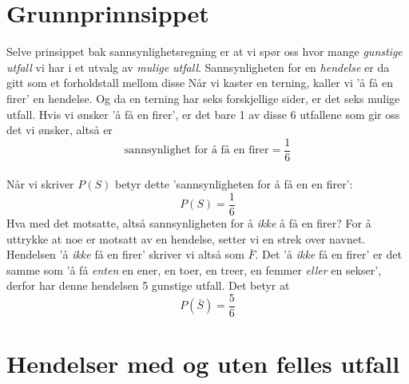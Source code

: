 

%

\section{Grunnprinnsippet}
Selve prinsippet bak sannsynlighetsregning er at vi spør oss hvor mange \textit{gunstige utfall}  vi har i et utvalg av \textit{mulige utfall}. Sannsynligheten for en \textit{hendelse} er da gitt som et forholdstall mellom disse \regv
{} \vsk
Når vi kaster en terning, kaller vi 'å få en firer' en hendelse. Og da en terning har seks forskjellige sider, er det seks mulige utfall.
Hvis vi ønsker 'å få en firer', er det bare 1 av disse 6 utfallene som gir oss det vi ønsker, altså er
\[ \text{sannsynlighet for å få en firer}=
 \frac{1}{6} \]
\qquad {} \\[5pt]
Når vi skriver $P(S)$ betyr dette 'sannsynligheten for å få en en firer':
\[ P(S)=\frac{1}{6} \]
Hva med det motsatte, altså sannsynligheten for å \textsl{ikke} å få en firer? For å uttrykke at noe er motsatt av en hendelse, setter vi en strek over navnet. Hendelsen 'å \textsl{ikke} få en firer' skriver vi altså som $ \bar{F} $. Det 'å \textsl{ikke} få en firer' er det samme som 'å få \textsl{enten} en ener, en toer, en treer, en femmer \textsl{eller} en sekser', derfor har denne hendelsen 5 gunstige utfall. Det betyr at
\[ P(\bar{S})=\frac{5}{6} \]
\section{Hendelser med og uten felles utfall}
